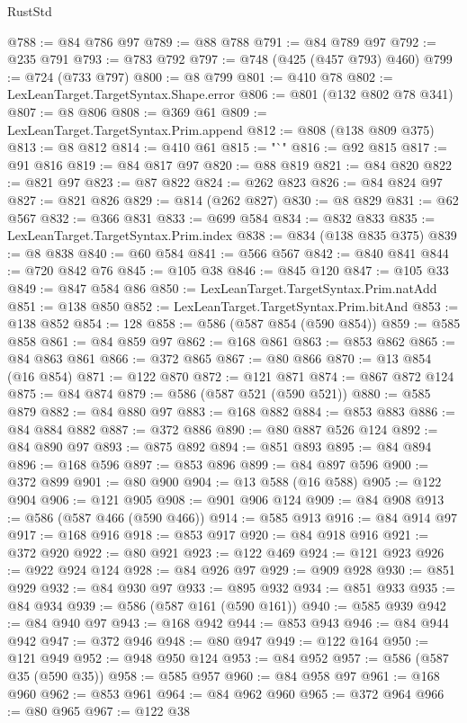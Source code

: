\begin{lexlean}{RustStd}
\begin{coremodule}
@788 := @84 @786 @97
@789 := @88 @788
@791 := @84 @789 @97
@792 := @235 @791
@793 := @783 @792
@797 := @748 (@425 (@457 @793) @460)
@799 := @724 (@733 @797)
@800 := @8 @799
@801 := @410 @78
@802 := LexLeanTarget.TargetSyntax.Shape.error
@806 := @801 (@132 @802 @78 @341)
@807 := @8 @806
@808 := @369 @61
@809 := LexLeanTarget.TargetSyntax.Prim.append
@812 := @808 (@138 @809 @375)
@813 := @8 @812
@814 := @410 @61
@815 := "`"
@816 := @92 @815
@817 := @91 @816
@819 := @84 @817 @97
@820 := @88 @819
@821 := @84 @820
@822 := @821 @97
@823 := @87 @822
@824 := @262 @823
@826 := @84 @824 @97
@827 := @821 @826
@829 := @814 (@262 @827)
@830 := @8 @829
@831 := @62 @567
@832 := @366 @831
@833 := @699 @584
@834 := @832 @833
@835 := LexLeanTarget.TargetSyntax.Prim.index
@838 := @834 (@138 @835 @375)
@839 := @8 @838
@840 := @60 @584
@841 := @566 @567
@842 := @840 @841
@844 := @720 @842 @76
@845 := @105 @38
@846 := @845 @120
@847 := @105 @33
@849 := @847 @584 @86
@850 := LexLeanTarget.TargetSyntax.Prim.natAdd
@851 := @138 @850
@852 := LexLeanTarget.TargetSyntax.Prim.bitAnd
@853 := @138 @852
@854 := 128
@858 := @586 (@587 @854 (@590 @854))
@859 := @585 @858
@861 := @84 @859 @97
@862 := @168 @861
@863 := @853 @862
@865 := @84 @863 @861
@866 := @372 @865
@867 := @80 @866
@870 := @13 @854 (@16 @854)
@871 := @122 @870
@872 := @121 @871
@874 := @867 @872 @124
@875 := @84 @874
@879 := @586 (@587 @521 (@590 @521))
@880 := @585 @879
@882 := @84 @880 @97
@883 := @168 @882
@884 := @853 @883
@886 := @84 @884 @882
@887 := @372 @886
@890 := @80 @887 @526 @124
@892 := @84 @890 @97
@893 := @875 @892
@894 := @851 @893
@895 := @84 @894
@896 := @168 @596
@897 := @853 @896
@899 := @84 @897 @596
@900 := @372 @899
@901 := @80 @900
@904 := @13 @588 (@16 @588)
@905 := @122 @904
@906 := @121 @905
@908 := @901 @906 @124
@909 := @84 @908
@913 := @586 (@587 @466 (@590 @466))
@914 := @585 @913
@916 := @84 @914 @97
@917 := @168 @916
@918 := @853 @917
@920 := @84 @918 @916
@921 := @372 @920
@922 := @80 @921
@923 := @122 @469
@924 := @121 @923
@926 := @922 @924 @124
@928 := @84 @926 @97
@929 := @909 @928
@930 := @851 @929
@932 := @84 @930 @97
@933 := @895 @932
@934 := @851 @933
@935 := @84 @934
@939 := @586 (@587 @161 (@590 @161))
@940 := @585 @939
@942 := @84 @940 @97
@943 := @168 @942
@944 := @853 @943
@946 := @84 @944 @942
@947 := @372 @946
@948 := @80 @947
@949 := @122 @164
@950 := @121 @949
@952 := @948 @950 @124
@953 := @84 @952
@957 := @586 (@587 @35 (@590 @35))
@958 := @585 @957
@960 := @84 @958 @97
@961 := @168 @960
@962 := @853 @961
@964 := @84 @962 @960
@965 := @372 @964
@966 := @80 @965
@967 := @122 @38

\end{coremodule}
\end{lexlean}
